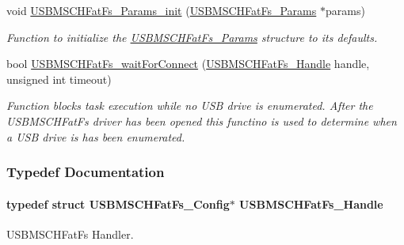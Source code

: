 \begin{DoxyCompactItemize}
void \hyperlink{_u_s_b_m_s_c_h_fat_fs_8h_ae46d9bf936f1837eddea6e787954afec}{U\+S\+B\+M\+S\+C\+H\+Fat\+Fs\+\_\+\+Params\+\_\+init} (\hyperlink{struct_u_s_b_m_s_c_h_fat_fs___params}{U\+S\+B\+M\+S\+C\+H\+Fat\+Fs\+\_\+\+Params} $\ast$params)
\begin{DoxyCompactList}\small\item\em Function to initialize the \hyperlink{struct_u_s_b_m_s_c_h_fat_fs___params}{U\+S\+B\+M\+S\+C\+H\+Fat\+Fs\+\_\+\+Params} structure to its defaults. \end{DoxyCompactList}\item 
bool \hyperlink{_u_s_b_m_s_c_h_fat_fs_8h_afc7ee4e1bbb95a37943335833a27f94c}{U\+S\+B\+M\+S\+C\+H\+Fat\+Fs\+\_\+wait\+For\+Connect} (\hyperlink{_u_s_b_m_s_c_h_fat_fs_8h_ae35f957205bbddee73fb052b33b1719b}{U\+S\+B\+M\+S\+C\+H\+Fat\+Fs\+\_\+\+Handle} handle, unsigned int timeout)
\begin{DoxyCompactList}\small\item\em Function blocks task execution while no U\+S\+B drive is enumerated. After the U\+S\+B\+M\+S\+C\+H\+Fat\+Fs driver has been opened this functino is used to determine when a U\+S\+B drive is has been enumerated. \end{DoxyCompactList}\end{DoxyCompactItemize}


\subsubsection{Typedef Documentation}
\paragraph[{U\+S\+B\+M\+S\+C\+H\+Fat\+Fs\+\_\+\+Handle}]{\setlength{\rightskip}{0pt plus 5cm}typedef struct {\bf U\+S\+B\+M\+S\+C\+H\+Fat\+Fs\+\_\+\+Config}$\ast$ {\bf U\+S\+B\+M\+S\+C\+H\+Fat\+Fs\+\_\+\+Handle}}\label{_u_s_b_m_s_c_h_fat_fs_8h_ae35f957205bbddee73fb052b33b1719b}


U\+S\+B\+M\+S\+C\+H\+Fat\+Fs Handler. 

